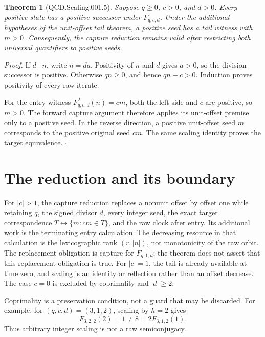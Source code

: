 \documentclass[11pt,letterpaper]{article}
\newtheorem{theorem}{Theorem}
\newenvironment{proof}{\noindent\textit{Proof.}}{\hfill\(\square\)}
\begin{document}
\begin{theorem}[QCD.Scaling.001.5]
Suppose \(q\ge0\), \(c>0\), and \(d>0\). Every positive state has a positive
successor under \(F_{q,c,d}\). Under the additional hypotheses of the unit-offset
tail theorem, a positive seed has a tail witness with \(m>0\). Consequently, the
capture reduction remains valid after restricting both universal quantifiers to
positive seeds.
\end{theorem}
\begin{proof}
If \(d\mid n\), write \(n=da\). Positivity of \(n\) and \(d\) gives \(a>0\), so
the division successor is positive. Otherwise \(qn\ge0\), and hence
\(qn+c>0\). Induction proves positivity of every raw iterate.

For the entry witness \(F_{q,c,d}^{\,t}(n)=cm\), both the left side and \(c\) are
positive, so \(m>0\). The forward capture argument therefore applies its
unit-offset premise only to a positive seed. In the reverse direction, a positive
unit-offset seed \(m\) corresponds to the positive original seed \(cm\). The same
scaling identity proves the target equivalence.
\end{proof}

\section{The reduction and its boundary}

For \(|c|>1\), the capture reduction replaces a nonunit offset by offset one while
retaining \(q\), the signed divisor \(d\), every integer seed, the exact target
correspondence \(T\leftrightarrow\{m:cm\in T\}\), and the raw clock after
entry. Its additional work is the terminating entry calculation. The decreasing
resource in that calculation is the lexicographic rank \((r,|n|)\), not
monotonicity of the raw orbit.
The replacement obligation is capture for \(F_{q,1,d}\); the theorem does not assert
that this replacement obligation is true. For \(|c|=1\), the tail is already
available at time zero, and scaling is an identity or reflection rather than
an offset decrease. The case \(c=0\) is excluded by coprimality and \(|d|\ge2\).

Coprimality is a preservation condition, not a guard that may be discarded.
For example, for \((q,c,d)=(3,1,2)\), scaling by \(h=2\) gives
\[
F_{3,2,2}(2)=1\ne8=2F_{3,1,2}(1).
\]
Thus arbitrary integer scaling is not a raw semiconjugacy.



\end{document}
